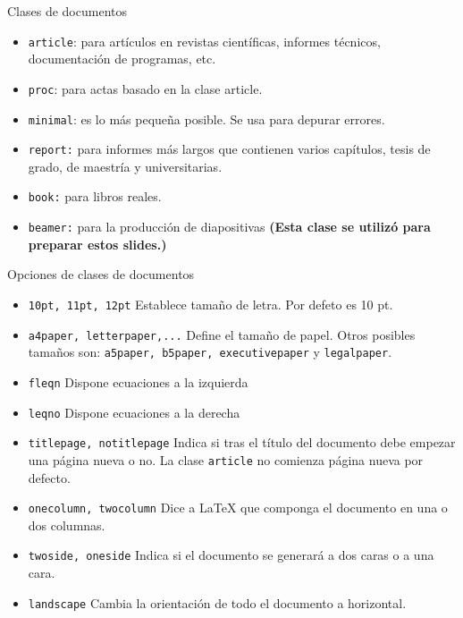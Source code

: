 \documentclass[10pt]{beamer}
\begin{document}
\begin{frame}{Clases de documentos}
	\begin{itemize}
	\item \texttt{article}: para artículos en revistas científicas, informes técnicos, documentación de programas, etc.
	\item \texttt{proc}: para actas basado en la clase article.
	\item \texttt{minimal}: es lo más pequeña posible. Se usa para depurar errores.
	\item \texttt{report:} para informes más largos que contienen varios capítulos, tesis de grado, de maestría y universitarias.
	\item \texttt{book:} para libros reales.
	\item \texttt{beamer:} para la producción de diapositivas \textbf{(Esta clase se utilizó para preparar estos slides.)}
	\end{itemize}

\end{frame}

\begin{frame}{Opciones de clases de documentos}
	\begin{itemize}
	\item \texttt{10pt, 11pt, 12pt} Establece tamaño de letra. Por defeto es 10 pt. 
	\item \texttt{a4paper, letterpaper,...} Define el tamaño de papel. Otros posibles tamaños son: \texttt{a5paper, b5paper, executivepaper} y \texttt{legalpaper}.
	\item \texttt{fleqn} Dispone ecuaciones a la izquierda
	\item \texttt{leqno} Dispone ecuaciones a la derecha\\
	\item \texttt{titlepage, notitlepage} Indica si tras el título del documento debe empezar una página nueva o no. La clase \texttt{article} no comienza página nueva por defecto.
	\item \texttt{onecolumn, twocolumn} Dice a \LaTeX{} que componga el documento en una o dos columnas.
	\item \texttt{twoside, oneside} Indica si el documento se generará a dos caras o a una cara.
	\item \texttt{landscape} Cambia la orientación de todo el documento a horizontal.
	\end{itemize}
\end{frame}
\end{document}
